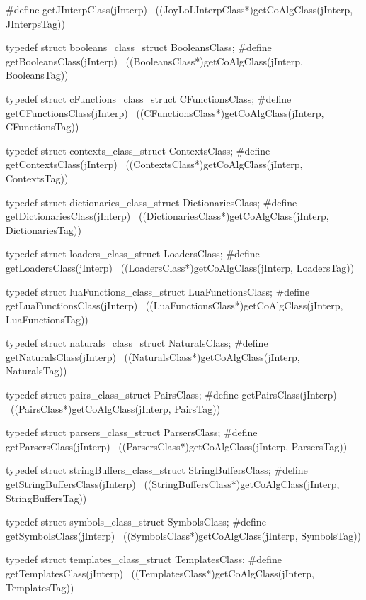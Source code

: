 #define getJInterpClass(jInterp)                            \
  ((JoyLoLInterpClass*)getCoAlgClass(jInterp, JInterpsTag))

typedef struct booleans_class_struct BooleansClass;
#define getBooleansClass(jInterp)                           \
  ((BooleansClass*)getCoAlgClass(jInterp, BooleansTag))

typedef struct cFunctions_class_struct CFunctionsClass;
#define getCFunctionsClass(jInterp)                         \
  ((CFunctionsClass*)getCoAlgClass(jInterp, CFunctionsTag))

typedef struct contexts_class_struct ContextsClass;
#define getContextsClass(jInterp)                           \
  ((ContextsClass*)getCoAlgClass(jInterp, ContextsTag))

typedef struct dictionaries_class_struct DictionariesClass;
#define getDictionariesClass(jInterp)                \
  ((DictionariesClass*)getCoAlgClass(jInterp, DictionariesTag))

typedef struct loaders_class_struct LoadersClass;
#define getLoadersClass(jInterp)                          \
  ((LoadersClass*)getCoAlgClass(jInterp, LoadersTag))

typedef struct luaFunctions_class_struct LuaFunctionsClass;
#define getLuaFunctionsClass(jInterp)                          \
  ((LuaFunctionsClass*)getCoAlgClass(jInterp, LuaFunctionsTag))

typedef struct naturals_class_struct NaturalsClass;
#define getNaturalsClass(jInterp)                           \
  ((NaturalsClass*)getCoAlgClass(jInterp, NaturalsTag))

typedef struct pairs_class_struct PairsClass;
#define getPairsClass(jInterp)                              \
  ((PairsClass*)getCoAlgClass(jInterp, PairsTag))

typedef struct parsers_class_struct ParsersClass;
#define getParsersClass(jInterp)                            \
  ((ParsersClass*)getCoAlgClass(jInterp, ParsersTag))

typedef struct stringBuffers_class_struct StringBuffersClass;
#define getStringBuffersClass(jInterp)                      \
  ((StringBuffersClass*)getCoAlgClass(jInterp, StringBuffersTag))

typedef struct symbols_class_struct SymbolsClass;
#define getSymbolsClass(jInterp)                            \
  ((SymbolsClass*)getCoAlgClass(jInterp, SymbolsTag))
  
typedef struct templates_class_struct TemplatesClass;
#define getTemplatesClass(jInterp)                          \
  ((TemplatesClass*)getCoAlgClass(jInterp, TemplatesTag))


